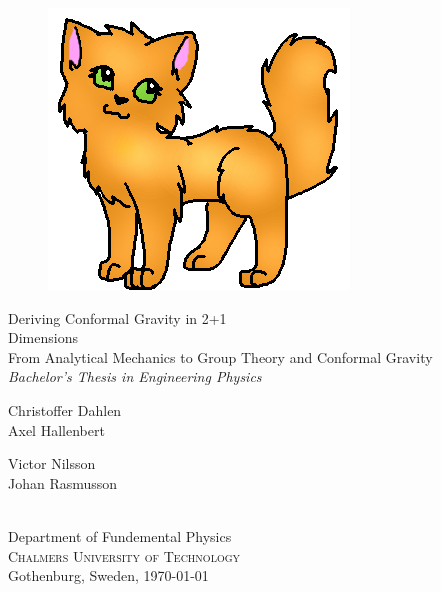 
\begin{titlepage}
			
\addtolength{\voffset}{2cm}

\begin{figure}[h!]
\centering
\vspace{2cm}	%
\includegraphics[width=0.5\linewidth]{pics/cat.png}
\end{figure}

\mbox{}
\vfill
\renewcommand{\familydefault}{\sfdefault} \normalfont %
{\Huge  	Deriving Conformal Gravity in 2+1\\ Dimensions} 	\\[0.5cm]
{\Large         From Analytical Mechanics to Group Theory and Conformal Gravity }\\[0.5cm]%
\textit{ Bachelor's Thesis in Engineering Physics} \\[0.5cm]


\begin{minipage}{0.6\textwidth}
\begin{flushleft} \large
Christoffer Dahlen\\
Axel Hallenbert
\end{flushleft}
\end{minipage}
\begin{minipage}{0.6\textwidth}
\begin{flushleft} \large
Victor Nilsson\\
Johan Rasmusson
\end{flushleft}
\end{minipage}\\[2.5cm]




Department of Fundemental Physics \\
\textsc{Chalmers University of Technology} \\
Gothenburg, Sweden, \today

\renewcommand{\familydefault}{\rmdefault} \normalfont %
\end{titlepage}


